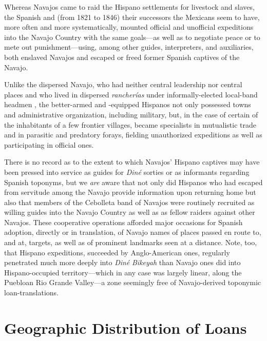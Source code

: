   Whereas Navajos came to raid the Hispano settlements for livestock and slaves, the Spanish and (from 1821 to 1846) their successors the Mexicans seem to have, more often and more systematically, mounted official and unofficial expeditions into the Navajo Country with the same goals—as well as to negotiate peace or to mete out punishment—using, among other guides, interpreters, and auxiliaries, both enslaved Navajos and escaped or freed former Spanish captives of the Navajo.  

  Unlike the dispersed Navajo, who had neither central leadership nor central places and who lived in dispersed \textit{rancherías} under informally-elected local-band headmen \citep{Jett1978}, the better-armed and -equipped Hispanos not only possessed towns and administrative organization, including military, but, in the case of certain of the inhabitants of a few frontier villages, became specialists in mutualistic trade and in parasitic and predatory forays, fielding unauthorized expeditions as well as participating in official ones.  

There is no record as to the extent to which Navajos’ Hispano captives may have been pressed into service as guides for \textit{Diné} sorties or as informants regarding Spanish toponyms, but we \textit{are} aware that not only did Hispanos who had escaped from servitude among the Navajo provide information upon returning home but also that members of the Cebolleta band of Navajos were routinely recruited as willing guides into the Navajo Country as well as as fellow raiders against other Navajos.  These cooperative operations afforded major occasions for Spanish adoption, directly or in translation, of Navajo names of places passed en route to, and at, targets, as well as of prominent landmarks seen at a distance.  Note, too, that Hispano expeditions, succeeded by Anglo-American ones, regularly penetrated much more deeply into \textit{Diné} \textit{Bikeyah} than Navajo ones did into Hispano-occupied territory—which in any case was largely linear, along the Puebloan Rio Grande Valley—a zone seemingly free of Navajo-derived toponymic loan-translations.

\section{\textbf{Geographic} \textbf{Distribution} \textbf{of} \textbf{Loans}}

